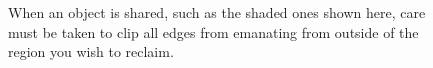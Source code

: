 \begin{figure}
\centering
{}
\qquad
{}
	\caption{When an object is shared, such as the shaded ones shown
	here, care must be taken to clip all edges from emanating from outside of the
	region you wish to reclaim.}
	\label{fig:reachability-sharing}
\end{figure}

